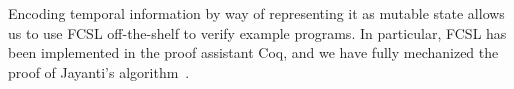 
%

Encoding temporal information by way of representing it as mutable
state allows us to use FCSL off-the-shelf to verify example
programs. In particular, FCSL has been implemented in the proof
assistant Coq, and we have fully mechanized the proof of Jayanti's
algorithm~\cite{CoqFiles}.


%


